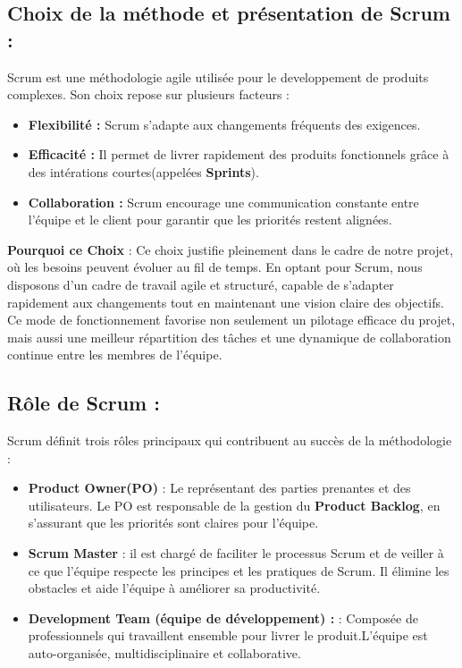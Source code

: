 \documentclass[a4paper,11pt]{report}
\begin{document}
\subsection{Choix de la méthode et présentation de Scrum :}

Scrum est une méthodologie agile utilisée pour le developpement de produits complexes. Son choix repose sur plusieurs facteurs : 

\begin{itemize}
	\item \textbf{Flexibilité :}  Scrum s'adapte aux changements fréquents des exigences.
	\item \textbf{Efficacité :} Il permet de livrer rapidement des produits fonctionnels grâce à des intérations courtes(appelées \textbf{Sprints}).
	\item \textbf{Collaboration : } Scrum encourage une communication constante entre l'équipe et le client pour garantir que les priorités restent alignées. 
\end{itemize}
\textbf{Pourquoi ce Choix} : 
\newline
Ce choix justifie pleinement dans le cadre de notre projet, où les besoins peuvent évoluer au fil de temps. 
En optant pour Scrum, nous disposons d'un cadre de travail agile et structuré, capable de s'adapter rapidement aux changements tout en maintenant une vision claire des objectifs. Ce mode de fonctionnement favorise non seulement un pilotage efficace du projet, mais aussi une meilleur répartition des tâches et une dynamique de collaboration continue entre les membres de l'équipe.


\subsection{Rôle de Scrum : }

Scrum définit trois rôles principaux qui contribuent au succès de la méthodologie :

\begin{itemize}
	\item \textbf{Product Owner(PO)} : Le représentant des parties prenantes et des utilisateurs. Le PO est responsable de la gestion du \textbf{Product Backlog}, en s'assurant que les priorités sont claires pour l'équipe.
	\item \textbf{Scrum Master} : il est chargé de faciliter le processus Scrum et de veiller à ce que l'équipe respecte les principes et les pratiques de Scrum. Il élimine les obstacles et aide l'équipe à améliorer sa productivité.
	\item \textbf{Development Team (équipe de développement) : } : Composée de professionnels qui travaillent ensemble pour livrer le produit.L'équipe est auto-organisée, multidisciplinaire et collaborative.
\end{itemize}
\end{document}
